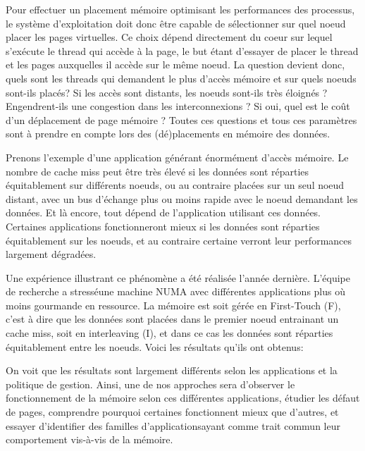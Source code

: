       Pour effectuer un placement mémoire optimisant les performances des
      processus, le système d'exploitation doit donc être capable de
      sélectionner sur quel noeud placer les pages virtuelles. Ce choix dépend
      directement du coeur sur lequel s'exécute le thread qui accède à la page,
      le but étant d'essayer de placer le thread et les pages auxquelles il
      accède sur le même noeud. La question devient donc, quels sont les threads
      qui demandent le plus d’accès mémoire et sur quels noeuds sont-ils placés?
      Si les accès sont distants, les noeuds sont-ils très éloignés ?
      Engendrent-ils une congestion dans les interconnexions ? Si oui, quel est
      le coût d'un déplacement de page mémoire ? Toutes ces questions et tous
      ces paramètres sont à prendre en compte lors des (dé)placements en mémoire
      des données.

      Prenons l'exemple d'une application générant énormément d'accès mémoire. Le
      nombre de cache miss peut être très élevé si les données sont réparties
      équitablement sur différents noeuds, ou au contraire placées sur un seul
      noeud distant, avec un bus d'échange plus ou moins rapide avec le noeud
      demandant les données. Et là encore, tout dépend de l'application utilisant
      ces données. Certaines applications fonctionneront mieux si les données sont
      réparties équitablement sur les noeuds, et au contraire certaine verront
      leur performances largement dégradées.

      Une expérience illustrant ce phénomène a été réalisée l'année
      dernière\cite{Holistic2013}. L'équipe de recherche a \og stressé\fg une
      machine NUMA avec différentes applications plus où moins gourmande en
      ressource. La mémoire est soit gérée en \og First-Touch (F)\fg, c'est à dire
      que les données sont placées dans le premier noeud entrainant un cache miss,
      soit en \og interleaving (I)\fg, et dans ce cas les données sont réparties
      équitablement entre les noeuds. Voici les résultats qu'ils ont obtenus:

      
      On voit que les résultats sont largement différents selon les applications
      et la politique de gestion. Ainsi, une de nos approches sera d'observer le
      fonctionnement de la mémoire selon ces différentes applications, étudier
      les défaut de pages, comprendre pourquoi certaines fonctionnent mieux que
      d'autres, et essayer d'identifier des \og familles d'applications\fg ayant
      comme trait commun leur comportement vis-à-vis de la mémoire.



    
    


  
